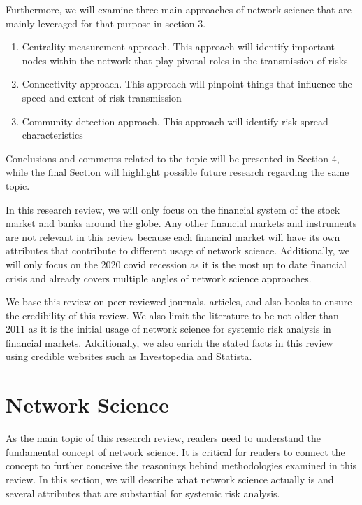 \documentclass[a4paper,11pt]{article}
\begin{document}
Furthermore, we will examine three main approaches of network science that are mainly leveraged for that purpose in section 3. 
\begin{enumerate}
        \item Centrality measurement approach. This approach will identify important nodes within the network that play pivotal roles in the transmission of risks
        \item Connectivity approach. This approach will pinpoint things that influence the speed and extent of risk transmission
        \item Community detection approach. This approach will identify risk spread characteristics
\end{enumerate}

Conclusions and comments related to the topic will be presented in Section 4, while the final Section will highlight possible future research regarding the same topic.

In this research review, we will only focus on the financial system of the stock market and banks around the globe. Any other financial markets and instruments are not relevant in this review because each financial market will have its own attributes that contribute to different usage of network science. Additionally, we will only focus on the 2020 covid recession as it is the most up to date financial crisis and already covers multiple angles of network science approaches.

We base this review on peer-reviewed journals, articles, and also books to ensure the credibility of this review. We also limit the literature to be not older than 2011 as it is the initial usage of network science for systemic risk analysis in financial markets. Additionally, we also enrich the stated facts in this review using credible websites such as Investopedia and Statista.


\section{Network Science}
As the main topic of this research review, readers need to understand the fundamental concept of network science. It is critical for readers to connect the concept to further conceive the reasonings behind methodologies examined in this review. In this section, we will describe what network science actually is and several attributes that are substantial for systemic risk analysis.
\end{document}
